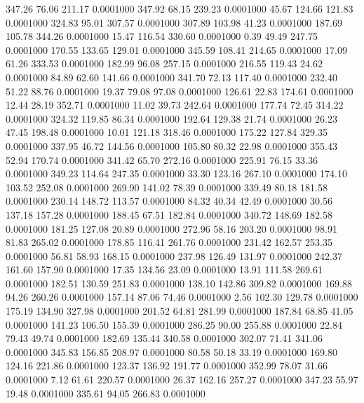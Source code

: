  347.26   76.06  211.17   0.0001000
 347.92   68.15  239.23   0.0001000
  45.67  124.66  121.83   0.0001000
 324.83   95.01  307.57   0.0001000
 307.89  103.98   41.23   0.0001000
 187.69  105.78  344.26   0.0001000
  15.47  116.54  330.60   0.0001000
   0.39   49.49  247.75   0.0001000
 170.55  133.65  129.01   0.0001000
 345.59  108.41  214.65   0.0001000
  17.09   61.26  333.53   0.0001000
 182.99   96.08  257.15   0.0001000
 216.55  119.43   24.62   0.0001000
  84.89   62.60  141.66   0.0001000
 341.70   72.13  117.40   0.0001000
 232.40   51.22   88.76   0.0001000
  19.37   79.08   97.08   0.0001000
 126.61   22.83  174.61   0.0001000
  12.44   28.19  352.71   0.0001000
  11.02   39.73  242.64   0.0001000
 177.74   72.45  314.22   0.0001000
 324.32  119.85   86.34   0.0001000
 192.64  129.38   21.74   0.0001000
  26.23   47.45  198.48   0.0001000
  10.01  121.18  318.46   0.0001000
 175.22  127.84  329.35   0.0001000
 337.95   46.72  144.56   0.0001000
 105.80   80.32   22.98   0.0001000
 355.43   52.94  170.74   0.0001000
 341.42   65.70  272.16   0.0001000
 225.91   76.15   33.36   0.0001000
 349.23  114.64  247.35   0.0001000
  33.30  123.16  267.10   0.0001000
 174.10  103.52  252.08   0.0001000
 269.90  141.02   78.39   0.0001000
 339.49   80.18  181.58   0.0001000
 230.14  148.72  113.57   0.0001000
  84.32   40.34   42.49   0.0001000
  30.56  137.18  157.28   0.0001000
 188.45   67.51  182.84   0.0001000
 340.72  148.69  182.58   0.0001000
 181.25  127.08   20.89   0.0001000
 272.96   58.16  203.20   0.0001000
  98.91   81.83  265.02   0.0001000
 178.85  116.41  261.76   0.0001000
 231.42  162.57  253.35   0.0001000
  56.81   58.93  168.15   0.0001000
 237.98  126.49  131.97   0.0001000
 242.37  161.60  157.90   0.0001000
  17.35  134.56   23.09   0.0001000
  13.91  111.58  269.61   0.0001000
 182.51  130.59  251.83   0.0001000
 138.10  142.86  309.82   0.0001000
 169.88   94.26  260.26   0.0001000
 157.14   87.06   74.46   0.0001000
   2.56  102.30  129.78   0.0001000
 175.19  134.90  327.98   0.0001000
 201.52   64.81  281.99   0.0001000
 187.84   68.85   41.05   0.0001000
 141.23  106.50  155.39   0.0001000
 286.25   90.00  255.88   0.0001000
  22.84   79.43   49.74   0.0001000
 182.69  135.44  340.58   0.0001000
 302.07   71.41  341.06   0.0001000
 345.83  156.85  208.97   0.0001000
  80.58   50.18   33.19   0.0001000
 169.80  124.16  221.86   0.0001000
 123.37  136.92  191.77   0.0001000
 352.99   78.07   31.66   0.0001000
   7.12   61.61  220.57   0.0001000
  26.37  162.16  257.27   0.0001000
 347.23   55.97   19.48   0.0001000
 335.61   94.05  266.83   0.0001000

